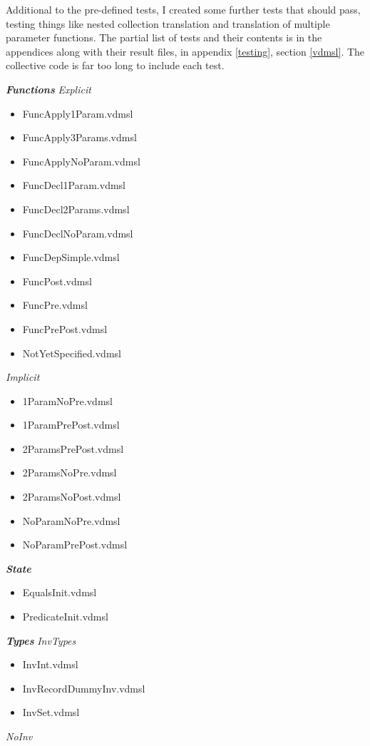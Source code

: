 Additional to the pre-defined tests, I created some further tests that should pass, testing things like nested collection translation and translation of multiple parameter functions. The partial list of tests and their contents is in the appendices along with their result files, in appendix \ref{testing}, section \ref{vdmsl}. The collective code is far too long to include each test.
\begin{multicols}{2}
\textbf{\emph{Functions}}\hfill\break
\emph{Explicit}
\begin{itemize}
\item FuncApply1Param.vdmsl
\item FuncApply3Params.vdmsl
\item FuncApplyNoParam.vdmsl
\item FuncDecl1Param.vdmsl
\item FuncDecl2Params.vdmsl
\item FuncDeclNoParam.vdmsl
\item FuncDepSimple.vdmsl
\item FuncPost.vdmsl
\item FuncPre.vdmsl
\item FuncPrePost.vdmsl
\item NotYetSpecified.vdmsl
\end{itemize}
\emph{Implicit}
\begin{itemize}
\item 1ParamNoPre.vdmsl
\item 1ParamPrePost.vdmsl
\item 2ParamsPrePost.vdmsl
\item 2ParamsNoPre.vdmsl
\item 2ParamsNoPost.vdmsl
\item NoParamNoPre.vdmsl
\item NoParamPrePost.vdmsl
\end{itemize}
\textbf{\emph{State}}
\begin{itemize}
\item EqualsInit.vdmsl
\item PredicateInit.vdmsl
\end{itemize}
\textbf{\emph{Types}}\hfill\break
\emph{InvTypes}
\begin{itemize}
\item InvInt.vdmsl
\item InvRecordDummyInv.vdmsl
\item InvSet.vdmsl
\end{itemize}
\emph{NoInv}
\begin{itemize}

\end{itemize}
\end{multicols}
